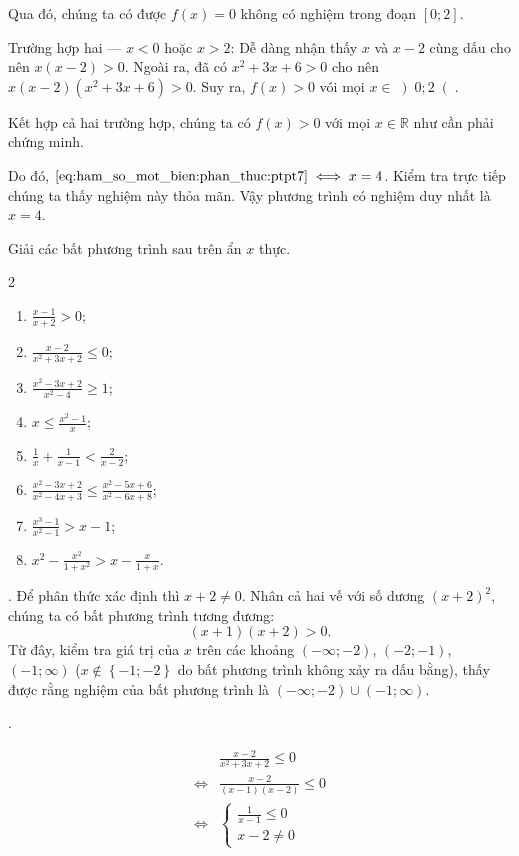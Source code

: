 Qua đó, chúng ta có được $f(x) = 0$ không có nghiệm trong đoạn $\left[0; 2\right]$.

\textcolor{colorEmphasis}{Trường hợp hai --- $x < 0$ hoặc $x > 2$}: Dễ dàng nhận thấy $x$ và $x - 2$ cùng dấu cho nên $x(x - 2) > 0$. Ngoài ra, đã có $x^2 + 3x + 6 > 0$ cho nên $x\left(x - 2\right)\left(x^2 + 3x + 6\right) > 0$. Suy ra, $f(x) > 0$ vói mọi $x \in \left)0; 2\right($.

Kết hợp cả hai trường hợp, chúng ta có $f(x) > 0$ với mọi $x \in \mathbb{R}$ như cần phải chứng minh.

Do đó, $\text{\eqref{eq:ham_so_mot_bien:phan_thuc:ptpt7}} \iff x = 4$. Kiểm tra trực tiếp chúng ta thấy nghiệm này thỏa mãn. Vậy phương trình có nghiệm duy nhất là $x = 4$.

\exercise Giải các bất phương trình sau trên ẩn $x$ thực.
\begin{multicols}{2}
   \begin{enumerate}
      \item $\frac{x-1}{x+2} > 0$;
      \item $\frac{x-2}{x^2+3x+2} \leq 0$;
      \item $\frac{x^2 - 3x + 2}{x^2 - 4} \geq 1$;
      \item $x \leq \frac{x^2 - 1}{x}$;
      \item $\frac {1}{x} + \frac{1}{x - 1} < \frac{2}{x - 2}$;
      \item $\frac{x^2 - 3x + 2}{x^2 - 4x + 3} \leq \frac{x^2 - 5x + 6}{x^2 - 6x + 8}$;
      \item $\frac{x^3-1}{x^2 - 1} > x - 1$;
      \item $x^2 - \frac{x^2}{1+x^2} > x - \frac{x}{1+x}$.
   \end{enumerate}
\end{multicols}

\solution

\setcounter{subexercise}{1}
. Để phân thức xác định thì $x + 2\neq 0$. Nhân cả hai vế với số dương $(x + 2)^2$, chúng ta có bất phương trình tương đương:
$$
   (x + 1)(x + 2) > 0.
$$
Từ đây, kiểm tra giá trị của $x$ trên các khoảng $\left(-\infty; -2\right)$, $\left(-2; -1\right)$, $\left(-1; \infty\right)$ ($x \notin \left\{-1; -2\right\}$ do bất phương trình không xảy ra dấu bằng), thấy được rằng nghiệm của bất phương trình là $\left(-\infty; -2\right) \cup \left(-1; \infty\right)$.

.

\begin{align}
   &\frac{x-2}{x^2+3x+2} \leq 0 \nonumber\\
   \iff &\frac{x-2}{(x - 1)(x - 2)} \leq 0 \nonumber\\ 
   \iff &\begin{cases}
      \frac{1}{x - 1} \leq 0 \\
      x - 2 \neq 0
   \end{cases} \label{eq:nen_tang_lo_gich:ham_so_mot_bien:phan_thuc:x-1x-2}
\end{align}

